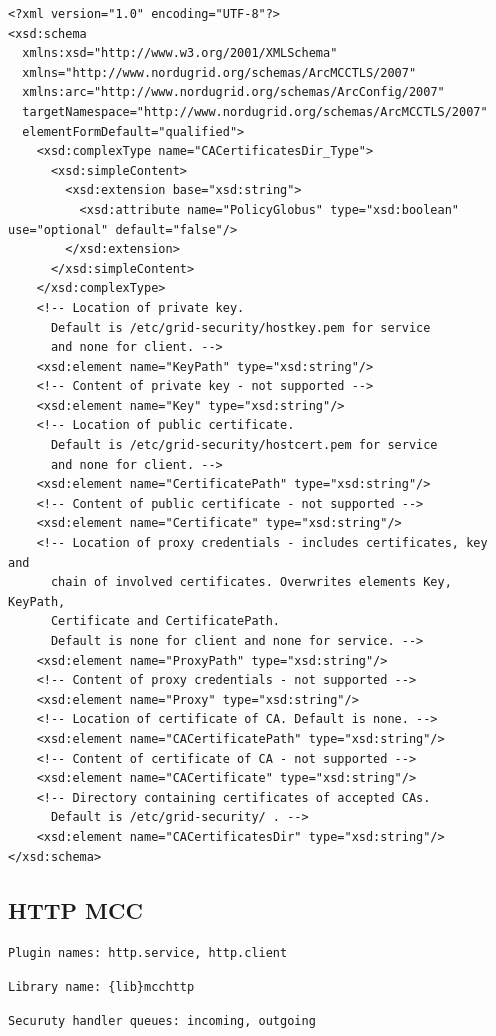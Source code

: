 \documentclass{book}
\begin{document}
\begin{verbatim}
<?xml version="1.0" encoding="UTF-8"?>
<xsd:schema
  xmlns:xsd="http://www.w3.org/2001/XMLSchema"
  xmlns="http://www.nordugrid.org/schemas/ArcMCCTLS/2007"
  xmlns:arc="http://www.nordugrid.org/schemas/ArcConfig/2007"
  targetNamespace="http://www.nordugrid.org/schemas/ArcMCCTLS/2007"
  elementFormDefault="qualified">
    <xsd:complexType name="CACertificatesDir_Type">
      <xsd:simpleContent>
        <xsd:extension base="xsd:string">
          <xsd:attribute name="PolicyGlobus" type="xsd:boolean" use="optional" default="false"/>
        </xsd:extension>
      </xsd:simpleContent>
    </xsd:complexType>
    <!-- Location of private key.
      Default is /etc/grid-security/hostkey.pem for service
      and none for client. -->
    <xsd:element name="KeyPath" type="xsd:string"/>
    <!-- Content of private key - not supported -->
    <xsd:element name="Key" type="xsd:string"/>
    <!-- Location of public certificate.
      Default is /etc/grid-security/hostcert.pem for service
      and none for client. -->
    <xsd:element name="CertificatePath" type="xsd:string"/>
    <!-- Content of public certificate - not supported -->
    <xsd:element name="Certificate" type="xsd:string"/>
    <!-- Location of proxy credentials - includes certificates, key and
      chain of involved certificates. Overwrites elements Key, KeyPath,
      Certificate and CertificatePath.
      Default is none for client and none for service. -->
    <xsd:element name="ProxyPath" type="xsd:string"/>
    <!-- Content of proxy credentials - not supported -->
    <xsd:element name="Proxy" type="xsd:string"/>
    <!-- Location of certificate of CA. Default is none. -->
    <xsd:element name="CACertificatePath" type="xsd:string"/>
    <!-- Content of certificate of CA - not supported -->
    <xsd:element name="CACertificate" type="xsd:string"/>
    <!-- Directory containing certificates of accepted CAs.
      Default is /etc/grid-security/ . -->
    <xsd:element name="CACertificatesDir" type="xsd:string"/>
</xsd:schema>
\end{verbatim}

\subsection{HTTP MCC}

\texttt{Plugin names: http.service, http.client}

\texttt{Library name: \{lib\}mcchttp}

\texttt{Securuty handler queues: incoming, outgoing}
\end{document}
